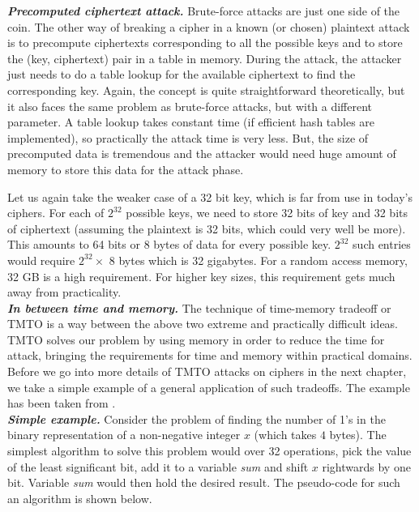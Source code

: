 \noindent \textit{\textbf{Precomputed ciphertext attack.}} Brute-force attacks are just one side of the coin. The other way of breaking a cipher in a known (or chosen) plaintext attack is to precompute ciphertexts corresponding to all the possible keys and to store the (key, ciphertext) pair in a table in memory. During the attack, the attacker just needs to do a table lookup for the available ciphertext to find the corresponding key. Again, the concept is quite straightforward theoretically, but it also faces the same problem as brute-force attacks, but with a different parameter. A table lookup takes constant time (if efficient hash tables are implemented), so practically the attack time is very less. But, the size of precomputed data is tremendous and the attacker would need huge amount of memory to store this data for the attack phase. 

Let us again take the weaker case of a 32 bit key, which is far from use in today's ciphers. For each of $2^{32}$ possible keys, we need to store 32 bits of key and 32 bits of ciphertext (assuming the plaintext is 32 bits, which could very well be more). This amounts to 64 bits or 8 bytes of data for every possible key. $2^{32}$ such entries would require $2^{32} \times$ 8 bytes which is 32 gigabytes. For a random access memory, 32 GB is a high requirement. For higher key sizes, this requirement gets much away from practicality.\\

\noindent \textit{\textbf{In between time and memory.}} The technique of time-memory tradeoff or TMTO is a way between the above two extreme and practically difficult ideas. TMTO solves our problem by using memory in order to reduce the time for attack, bringing the requirements for time and memory within  practical domains. Before we go into more details of TMTO attacks on ciphers in the next chapter, we take a simple example of a general application of such tradeoffs. The example has been taken from \cite{stamp2003out}. \\

\noindent \textit{\textbf{Simple example.}} Consider the problem of finding the number of 1's in the binary representation of a non-negative integer $x$ (which takes $4$ bytes). The simplest algorithm to solve this problem would over 32 operations, pick the value of the least significant bit, add it to a variable \textit{sum} and shift $x$ rightwards by one bit. Variable \textit{sum} would then hold the desired result. The pseudo-code for such an algorithm is shown below.

